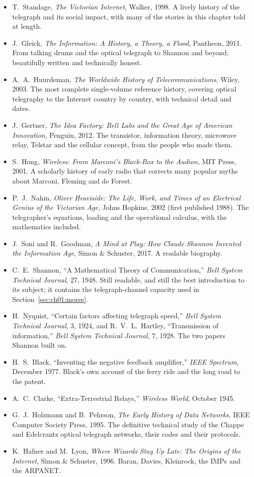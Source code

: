 \furtherreading
{}
\begin{itemize}
\item T.~Standage, \emph{The Victorian Internet}, Walker, 1998. A lively history of the telegraph and its
social impact, with many of the stories in this chapter told at length.
\item J.~Gleick, \emph{The Information: A History, a Theory, a Flood}, Pantheon, 2011. From talking drums
and the optical telegraph to Shannon and beyond; beautifully written and technically honest.
\item A.~A.~Huurdeman, \emph{The Worldwide History of Telecommunications}, Wiley, 2003. The most complete
single-volume reference history, covering optical telegraphy to the Internet country by country, with
technical detail and dates.
\item J.~Gertner, \emph{The Idea Factory: Bell Labs and the Great Age of American Innovation}, Penguin, 2012.
The transistor, information theory, microwave relay, Telstar and the cellular concept, from the people who
made them.
\item S.~Hong, \emph{Wireless: From Marconi's Black-Box to the Audion}, MIT Press, 2001. A scholarly history
of early radio that corrects many popular myths about Marconi, Fleming and de Forest.
\item P.~J.~Nahin, \emph{Oliver Heaviside: The Life, Work, and Times of an Electrical Genius of the Victorian
Age}, Johns Hopkins, 2002 (first published 1988). The telegrapher's equations, loading and the operational
calculus, with the mathematics included.
\item J.~Soni and R.~Goodman, \emph{A Mind at Play: How Claude Shannon Invented the Information Age}, Simon \&
Schuster, 2017. A readable biography.
\item C.~E.~Shannon, ``A Mathematical Theory of Communication,'' \emph{Bell System Technical Journal}, 27,
1948. Still readable, and still the best introduction to its subject; it contains the telegraph-channel
capacity used in Section~\ref{sec:ch01:morse}.
\item H.~Nyquist, ``Certain factors affecting telegraph speed,'' \emph{Bell System Technical Journal}, 3,
1924, and R.~V.~L.~Hartley, ``Transmission of information,'' \emph{Bell System Technical Journal}, 7, 1928.
The two papers Shannon built on.
\item H.~S.~Black, ``Inventing the negative feedback amplifier,'' \emph{IEEE Spectrum}, December 1977. Black's
own account of the ferry ride and the long road to the patent.
\item A.~C.~Clarke, ``Extra-Terrestrial Relays,'' \emph{Wireless World}, October 1945.
\item G.~J.~Holzmann and B.~Pehrson, \emph{The Early History of Data Networks}, IEEE Computer Society Press,
1995. The definitive technical study of the Chappe and Edelcrantz optical telegraph networks, their codes and
their protocols.
\item K.~Hafner and M.~Lyon, \emph{Where Wizards Stay Up Late: The Origins of the Internet}, Simon \& Schuster,
1996. Baran, Davies, Kleinrock, the IMPs and the ARPANET.
\end{itemize}
